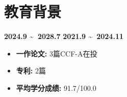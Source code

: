 \documentclass[UTF8,AutoFakeBold]{resume}
\begin{document}
\section{\hspace{0.25em}\makebox[0.75em][c]{\faGraduationCap} \fangsong\textbf{教育背景}}
{\quad \textbf{2024.9 \textasciitilde \ 2028.7}}
{\quad \textbf{2021.9 \textasciitilde \ 2024.11}}
    \begin{minipage}[t]{0.40\textwidth}
    	\begin{itemize}
    		\item \kaishu\textbf{一作论文: }3篇CCF-A在投
    	\end{itemize}
    \end{minipage}
    \begin{minipage}[t]{0.20\textwidth}
    	\begin{itemize}
    		\item \kaishu\textbf{专利: }2篇
    	\end{itemize}
    \end{minipage}
    \begin{minipage}[t]{0.40\textwidth}
    	\begin{itemize}
    		\item \kaishu\textbf{平均学分成绩: }91.7/100.0
    	\end{itemize}
    \end{minipage}
\end{document}
